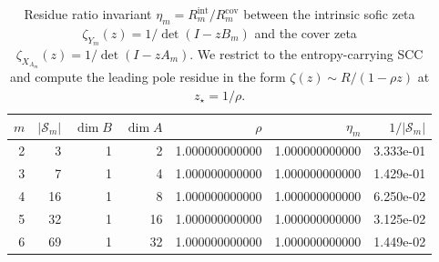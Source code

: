 \begin{table}[H]
\centering
\scriptsize
\setlength{\tabcolsep}{6pt}
\caption{Residue ratio invariant $\eta_m=R^{\mathrm{int}}_m/R^{\mathrm{cov}}_m$ between the intrinsic sofic zeta $\zeta_{Y_m}(z)=1/\det(I-zB_m)$ and the cover zeta $\zeta_{X_{A_m}}(z)=1/\det(I-zA_m)$. We restrict to the entropy-carrying SCC and compute the leading pole residue in the form $\zeta(z)\sim R/(1-\rho z)$ at $z_\star=1/\rho$.}
\label{tab:phi_m_sofic_residue_ratio}
\begin{tabular}{r r r r r r r}
\toprule
$m$ & $|\mathcal{S}_m|$ & $\dim B$ & $\dim A$ & $\rho$ & $\eta_m$ & $1/|\mathcal{S}_m|$\\
\midrule
2 & 3 & 1 & 2 & 1.000000000000 & 1.000000000000 & 3.333e-01\\
3 & 7 & 1 & 4 & 1.000000000000 & 1.000000000000 & 1.429e-01\\
4 & 16 & 1 & 8 & 1.000000000000 & 1.000000000000 & 6.250e-02\\
5 & 32 & 1 & 16 & 1.000000000000 & 1.000000000000 & 3.125e-02\\
6 & 69 & 1 & 32 & 1.000000000000 & 1.000000000000 & 1.449e-02\\
\bottomrule
\end{tabular}
\end{table}
